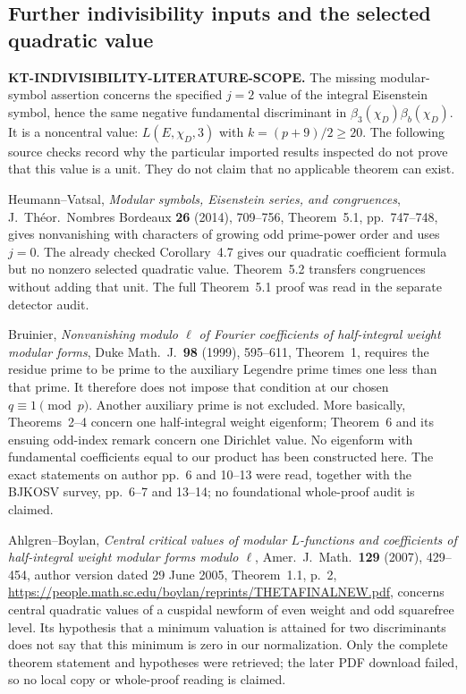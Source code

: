 \documentclass[11pt,a4paper]{article}
\theoremstyle{definition}
\renewcommand{\paragraph}[1]{\par\smallskip\noindent\textbf{#1}\quad\ignorespaces}
\begin{document}


\subsection{Further indivisibility inputs and the selected quadratic value}

\paragraph{KT-INDIVISIBILITY-LITERATURE-SCOPE.}
The missing modular-symbol assertion concerns the specified
$j=2$ value of the integral Eisenstein symbol, hence the same
negative fundamental discriminant in
$\beta_3(\chi_D)\beta_b(\chi_D)$.
It is a noncentral value: $L(E,\chi_D,3)$ with
$k=(p+9)/2\geq20$.  The following source checks record why
the particular imported results inspected do not prove that
this value is a unit.  They do not claim that no applicable
theorem can exist.

Heumann--Vatsal, \emph{Modular symbols, Eisenstein series,
and congruences}, J.~Th\'eor.~Nombres Bordeaux \textbf{26} (2014),
709--756, Theorem~5.1, pp.~747--748, gives nonvanishing with
characters of growing odd prime-power order and uses $j=0$.
The already checked Corollary~4.7 gives our quadratic
coefficient formula but no nonzero selected quadratic value.
Theorem~5.2 transfers congruences without adding that unit.
The full Theorem~5.1 proof was read in the separate detector
audit.

Bruinier, \emph{Nonvanishing modulo $\ell$ of Fourier
coefficients of half-integral weight modular forms},
Duke Math.~J.~\textbf{98} (1999), 595--611, Theorem~1,
requires the residue prime to be prime to the auxiliary
Legendre prime times one less than that prime.  It therefore
does not impose that condition at our chosen $q\equiv1\pmod p$.
Another auxiliary prime is not excluded.  More basically,
Theorems~2--4 concern one half-integral weight eigenform;
Theorem~6 and its ensuing odd-index remark concern one
Dirichlet value.  No eigenform with fundamental coefficients
equal to our product has been constructed here.  The exact
statements on author pp.~6 and 10--13 were read, together
with the BJKOSV survey, pp.~6--7 and 13--14; no foundational
whole-proof audit is claimed.

Ahlgren--Boylan, \emph{Central critical values of modular
$L$-functions and coefficients of half-integral weight modular
forms modulo $\ell$}, Amer.~J.~Math.~\textbf{129} (2007),
429--454, author version dated 29 June 2005,
Theorem~1.1, p.~2,
\url{https://people.math.sc.edu/boylan/reprints/THETAFINALNEW.pdf},
concerns central quadratic values of a cuspidal newform of
even weight and odd squarefree level.  Its hypothesis that
a minimum valuation is attained for two discriminants does
not say that this minimum is zero in our normalization.
Only the complete theorem statement and hypotheses were
retrieved; the later PDF download failed, so no local copy
or whole-proof reading is claimed.
\end{document}
